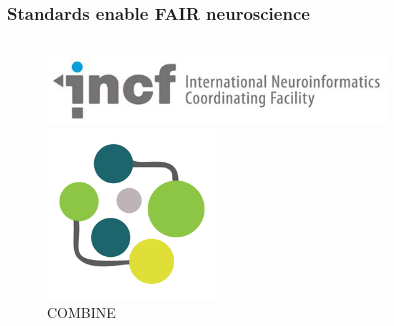 \begin{frame}[c]
  \frametitle{Standards enable FAIR neuroscience}
  \begin{columns}
    \begin{column}{0.5\textwidth}
      \begin{figure}[h]
        \centering
        \includegraphics[width=0.8\textwidth]{99_images/incf}\\\vspace{0.2cm}
        \includegraphics[width=0.4\textwidth]{99_images/combine}\\
        \scriptsize{COMBINE}
      \end{figure}%
    \end{column}
\end{columns}
\end{frame}
